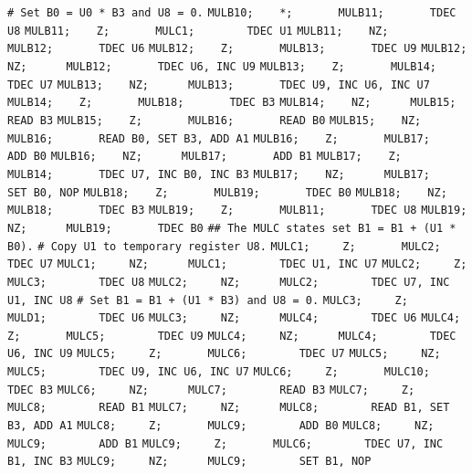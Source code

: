 \begin{apgsembly}
\begin{minipage}[t]{.49\textwidth}
		\begin{algorithmic}\tiny
			\State \verb|# Set B0 = U0 * B3 and U8 = 0.|
			\State \verb|MULB10;    *;       MULB11;       TDEC U8|
			\State \verb|MULB11;    Z;       MULC1;        TDEC U1|
			\State \verb|MULB11;    NZ;      MULB12;       TDEC U6|
			\State \verb|MULB12;    Z;       MULB13;       TDEC U9|
			\State \verb|MULB12;    NZ;      MULB12;       TDEC U6, INC U9|
			\State \verb|MULB13;    Z;       MULB14;       TDEC U7|
			\State \verb|MULB13;    NZ;      MULB13;       TDEC U9, INC U6, INC U7|
			\State \verb|MULB14;    Z;       MULB18;       TDEC B3|
			\State \verb|MULB14;    NZ;      MULB15;       READ B3|
			\State \verb|MULB15;    Z;       MULB16;       READ B0|
			\State \verb|MULB15;    NZ;      MULB16;       READ B0, SET B3, ADD A1|
			\State \verb|MULB16;    Z;       MULB17;       ADD B0|
			\State \verb|MULB16;    NZ;      MULB17;       ADD B1|
			\State \verb|MULB17;    Z;       MULB14;       TDEC U7, INC B0, INC B3|
			\State \verb|MULB17;    NZ;      MULB17;       SET B0, NOP|
			\State \verb|MULB18;    Z;       MULB19;       TDEC B0|
			\State \verb|MULB18;    NZ;      MULB18;       TDEC B3|
			\State \verb|MULB19;    Z;       MULB11;       TDEC U8|
			\State \verb|MULB19;    NZ;      MULB19;       TDEC B0|
			\State \verb||
			\State \verb|## The MULC states set B1 = B1 + (U1 * B0).|
			\State \verb|# Copy U1 to temporary register U8.|
			\State \verb|MULC1;     Z;       MULC2;        TDEC U7|
			\State \verb|MULC1;     NZ;      MULC1;        TDEC U1, INC U7|
			\State \verb|MULC2;     Z;       MULC3;        TDEC U8|
			\State \verb|MULC2;     NZ;      MULC2;        TDEC U7, INC U1, INC U8|
			\State \verb||
			\State \verb|# Set B1 = B1 + (U1 * B3) and U8 = 0.|
			\State \verb|MULC3;     Z;       MULD1;        TDEC U6|
			\State \verb|MULC3;     NZ;      MULC4;        TDEC U6|
			\State \verb|MULC4;     Z;       MULC5;        TDEC U9|
			\State \verb|MULC4;     NZ;      MULC4;        TDEC U6, INC U9|
			\State \verb|MULC5;     Z;       MULC6;        TDEC U7|
			\State \verb|MULC5;     NZ;      MULC5;        TDEC U9, INC U6, INC U7|
			\State \verb|MULC6;     Z;       MULC10;       TDEC B3|
			\State \verb|MULC6;     NZ;      MULC7;        READ B3|
			\State \verb|MULC7;     Z;       MULC8;        READ B1|
			\State \verb|MULC7;     NZ;      MULC8;        READ B1, SET B3, ADD A1|
			\State \verb|MULC8;     Z;       MULC9;        ADD B0|
			\State \verb|MULC8;     NZ;      MULC9;        ADD B1|
			\State \verb|MULC9;     Z;       MULC6;        TDEC U7, INC B1, INC B3|
			\State \verb|MULC9;     NZ;      MULC9;        SET B1, NOP|

\end{algorithmic}
\end{minipage}
\end{apgsembly}
